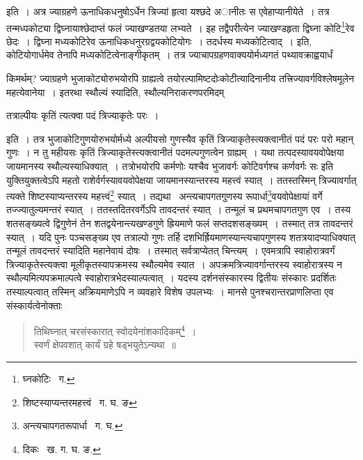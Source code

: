 \documentclass[11pt, openany]{book}
\begin{document}
\noindent इति~। अत्र ज्याग्रहणे ऊनाधिकधनुषोऽर्धेन त्रिज्यां हृत्वा यश्छदे अानीतः स एवेहाप्यानीयेते~। तत्र तन्मध्पकोट्या द्विघ्नायाश्छेदाप्तं फलं ज्याखण्डतया लभ्यते~। इह तद्वैपरीत्येन ज्याखण्डहृता द्विघ्ना कोटि\renewcommand{\thefootnote}{३}\footnote{घ्नकोटिः \textendash\ ग.}रेव छेदः~। द्विघ्ना मध्यकोटिरेव ऊनाधिकधनुरग्रद्वयकोटियोगः~। तदर्धस्य मध्यकोटित्वाद्~। इति, कोटियोगार्धमेव तेनापि मध्यकोटित्वेनाङ्गीकृतम्~। तत्र ज्याचापग्रहणवाक्ययोर्मध्यगतं पथ्यावक्राह्वयार्धं 

\newpage

\noindent किमर्थम्? ज्याग्रहणे भुजाकोट्योरुभयोरपि ग्राह्यत्वे तयोरल्पामिष्टदोःकोटीत्यादिनानीय तत्त्रिज्यावर्गविश्लेषमूलेन महत्येवानेया~। इतरथा स्थौल्यं स्यादिति, स्थौल्यनिराकरणपरमिदम्\textendash 

\begin{center}
{\qt तत्राल्पीयः कृतिं त्यत्क्वा पदं त्रिज्याकृतेः परः~।}
\end{center}

\noindent इति~। तत्र भुजाकोटिगुणयोरुभयोर्मध्ये अल्पीयसो गुणस्यैव कृतिं त्रिज्याकृतेस्त्यक्त्वानीतं पदं परः परो महान् गुणः~। न तु महीयसः कृतिं त्रिज्याकृतेस्त्यक्त्वानीतं पदमल्पगुणत्वेन ग्राह्यम्~। यथा तत्पदस्यावयवोपेक्षया जायमानस्य स्थौल्यस्याधिक्यात्~। तत्रोभयोरपि कर्मणोः {\qt यश्चैव भुजावर्गः कोटिवर्गश्च कर्णवर्गः सः} इति युक्तियुक्तत्वेऽपि महतो राशेर्वर्गस्यावयवोपेक्षया जायमानस्यान्तरस्य महत्त्वं स्यात्~। 
ततस्तस्मिन् त्रिज्यावर्गात् त्यक्ते शिष्टस्याप्यन्तरस्य महत्त्वं\renewcommand{\thefootnote}{१}\footnote{शिष्टस्याप्यन्तरमहत्त्वं \textendash\ ग. घ. ङ} स्यात्~। तद्यथा \textendash\ अन्त्यचापगतगुणस्य रूपार्धा\renewcommand{\thefootnote}{२}\footnote{अन्त्यचापगतरूपार्धा \textendash\ ग. घ.}वयवोपेक्षायां वर्गे तज्ज्यातुल्यमन्तरं स्यात्~। ततस्तदितरवर्गेऽपि तावदन्तरं स्यात्~। तन्मूलं च प्रथमचापगतगुण एव~। तस्य शतसङ्ख्यत्वे द्विगुणेनं तेन शतद्वयेनान्त्यखण्डगुणे ह्रियमाणे फलं सप्तदशसङ्ख्यम्~। तस्मात् तत्र तावदन्तरं स्यात्~। यदि पुनः पञ्चसङ्ख्य एव तत्राल्पो गुणः तर्हि दशभिर्ह्रियमाणस्यान्त्यचापगुणस्य शतत्रयादप्याधिक्यात् तन्मूलं तावदन्तरं स्यादिति महानेवायं दोषः~। तस्मात् सर्वत्राप्येतत् चिन्त्यम्~। एवमत्रापि स्वाहोरात्रवर्गं त्रिज्याकृतेस्त्यक्त्वा मूलीकृतस्यापक्रमस्य स्थौल्यमेव स्यात~। अपक्रमत्रिज्यावर्गान्तरस्य स्वाहोरात्रस्य न स्थौल्यमित्यपक्रमाल्पत्वे स्वाहोरात्रभेदस्याल्पत्वात्~। यदस्य दर्शनसंस्कारस्य द्वितीयः संस्कारः प्रदर्शितः तस्याल्पत्वात् तस्मिन् अक्रियमाणेऽपि न व्यवहारे विशेष उपलभ्यः~। मानसे पुनश्चरान्तरप्राणलिप्ता एव संस्कार्यत्वेनोक्ताः\textendash  
\begin{quote}
{\qt तिथिघ्नात् चरसंस्कारात् स्वोदयेनांशकादिकम्\renewcommand{\thefootnote}{३}\footnote{दिकः \textendash\ ख. ग. घ. ङ.}~। \\
स्वर्णं क्षेपवशात् कार्यं ग्रहे षड्भयुतेऽन्यथा~॥}
\end{quote}
\end{document}
